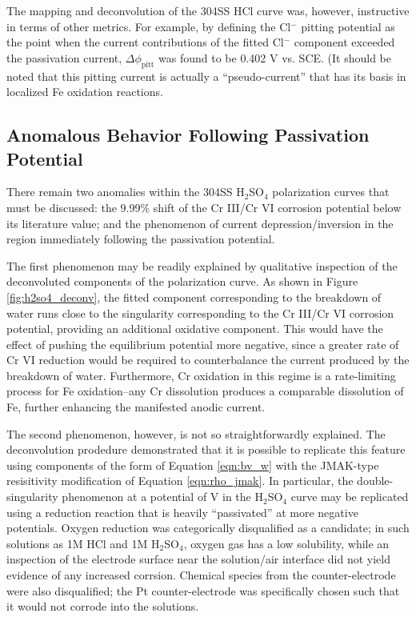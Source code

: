 The mapping and deconvolution of the 304SS HCl curve was, however, instructive in terms of other metrics.  For example, by defining the Cl$^-$ pitting potential as the point when the current contributions of the fitted Cl$^-$ component exceeded the passivation current, $\Delta \phi_{\text{pitt}}$ was found to be 0.402 V vs. SCE.  (It should be noted that this pitting current is actually a ``pseudo-current'' that has its basis in localized Fe oxidation reactions.

\subsection{Anomalous Behavior Following Passivation Potential}

There remain two anomalies within the 304SS H$_2$SO$_4$ polarization curves that must be discussed: the 9.99\% shift of the Cr III/Cr VI corrosion potential below its literature value; and the phenomenon of current depression/inversion in the region immediately following the passivation potential.

The first phenomenon may be readily explained by qualitative inspection of the deconvoluted components of the polarization curve.  As shown in Figure \ref{fig:h2so4_deconv}, the fitted component corresponding to the breakdown of water runs close to the singularity corresponding to the Cr III/Cr VI corrosion potential, providing an additional oxidative component.  This would have the effect of pushing the equilibrium potential more negative, since a greater rate of Cr VI reduction would be required to counterbalance the current produced by the breakdown of water.  Furthermore, Cr oxidation in this regime is a rate-limiting process for Fe oxidation--any Cr dissolution produces a comparable dissolution of Fe, further enhancing the manifested anodic current.

The second phenomenon, however, is not so straightforwardly explained.  The deconvolution prodedure demonstrated that it is possible to replicate this feature using components of the form of Equation \ref{eqn:bv_w} with the JMAK-type resisitivity modification of Equation \ref{eqn:rho_jmak}.  In particular, the double-singularity phenomenon at a potential of  V in the H$_2$SO$_4$ curve may be replicated using a reduction reaction that is heavily ``passivated'' at more negative potentials.  Oxygen reduction was categorically disqualified as a candidate; in such solutions as 1M HCl and 1M H$_2$SO$_4$, oxygen gas has a low solubility,\cite{labguide} while an inspection of the electrode surface near the solution/air interface did not yield evidence of any increased corrsion.  Chemical species from the counter-electrode were also disqualified; the Pt counter-electrode was specifically chosen such that it would not corrode into the solutions.\cite{devine}

